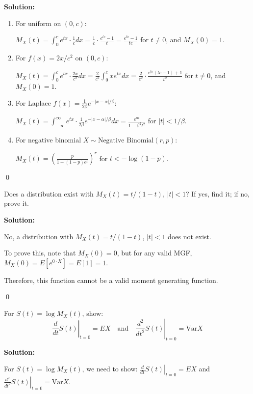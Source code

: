 \noindent\textbf{Solution:}
\begin{enumerate}[label=(\alph*)]
    \item For uniform on $(0,c)$:
    
    $M_X(t) = \int_0^c e^{tx} \cdot \frac{1}{c}dx = \frac{1}{c} \cdot \frac{e^{tc}-1}{t} = \frac{e^{tc}-1}{tc}$ for $t \neq 0$, and $M_X(0) = 1$.
    
    \item For $f(x)=2x/c^2$ on $(0,c)$:
    
    $M_X(t) = \int_0^c e^{tx} \cdot \frac{2x}{c^2}dx = \frac{2}{c^2} \int_0^c xe^{tx}dx = \frac{2}{c^2} \cdot \frac{e^{tc}(tc-1)+1}{t^2}$ for $t \neq 0$, and $M_X(0) = 1$.
    
    \item For Laplace $f(x)=\frac{1}{2\beta}e^{-|x-\alpha|/\beta}$:
    
    $M_X(t) = \int_{-\infty}^{\infty} e^{tx} \cdot \frac{1}{2\beta}e^{-|x-\alpha|/\beta}dx = \frac{e^{\alpha t}}{1-\beta^2 t^2}$ for $|t| < 1/\beta$.
    
    \item For negative binomial $X \sim \text{Negative Binomial}(r,p)$:
    
    $M_X(t) = \left(\frac{p}{1-(1-p)e^t}\right)^r$ for $t < -\log(1-p)$.
\end{enumerate}


\qed
\begin{problembox}
Does a distribution exist with $M_X(t)=t/(1-t)$, $|t|<1$? If yes, find it; if no, prove it.
\end{problembox}

\noindent\textbf{Solution:}

No, a distribution with $M_X(t)=t/(1-t)$, $|t|<1$ does not exist.

To prove this, note that $M_X(0) = 0$, but for any valid MGF, $M_X(0) = E[e^{0 \cdot X}] = E[1] = 1$.

Therefore, this function cannot be a valid moment generating function.


\qed
\begin{problembox}
For $S(t)=\log M_X(t)$, show:
\[ \left.\frac{d}{dt}S(t)\right|_{t=0} = EX \quad\text{and}\quad \left.\frac{d^2}{dt^2}S(t)\right|_{t=0} = \text{Var}X \]
\end{problembox}

\noindent\textbf{Solution:}

For $S(t)=\log M_X(t)$, we need to show:
$\left.\frac{d}{dt}S(t)\right|_{t=0} = EX$ and $\left.\frac{d^2}{dt^2}S(t)\right|_{t=0} = \text{Var}X$.

